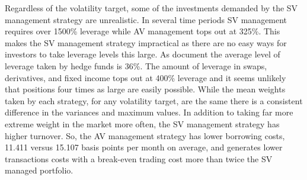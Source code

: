 Regardless of the volatility target, some of the investments demanded by the SV management strategy are unrealistic. In several time periods SV management requires over 1500\% leverage while AV management tops out at 325\%. This makes the SV management strategy impractical as there are no easy ways for investors to take leverage levels this large. As \citet{ang_hedge_2011} document the average level of leverage taken by hedge funds is 36\%. The amount of leverage in swaps, derivatives, and fixed income tops out at 400\% leverage and it seems unlikely that positions four times as large are easily possible.  While the mean weights taken by each strategy, for any volatility target, are the same there is a consistent difference in the variances and maximum values. In addition to taking far more extreme weight in the market more often, the SV management strategy has higher turnover. So, the AV management strategy has lower borrowing costs, 11.411 versus 15.107 basis points per month on average, and generates lower transactions costs with a break-even trading cost more than twice the SV managed portfolio. %

